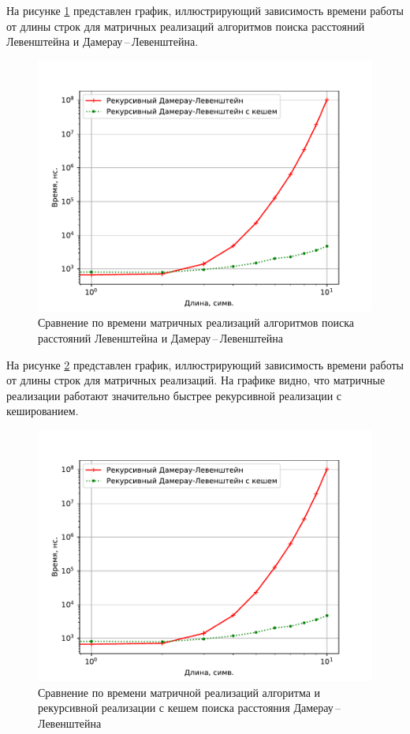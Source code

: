На рисунке \ref{plt:time_02} представлен график, иллюстрирующий зависимость времени работы от длины строк для матричных реализаций алгоритмов поиска расстояний Левенштейна и Дамерау\,--\,Левенштейна.
\begin{figure}[h]
	\centering
	\includegraphics[height=0.5\textheight, page=2]{img/figures.pdf}
	\caption{Сравнение по времени матричных реализаций алгоритмов поиска расстояний Левенштейна и Дамерау\,--\,Левенштейна}
	\label{plt:time_02}
\end{figure}

На рисунке \ref{plt:time_03} представлен график, иллюстрирующий зависимость времени работы от длины строк для матричных реализаций. На графике видно, что матричные реализации работают значительно быстрее рекурсивной реализации с кешированием. 
\begin{figure}[h]
	\centering
	\includegraphics[height=0.5\textheight, page=3]{img/figures.pdf}
	\caption{Сравнение по времени матричной реализаций алгоритма и рекурсивной реализации с кешем поиска расстояния Дамерау\,--\,Левенштейна}
	\label{plt:time_03}
\end{figure}


